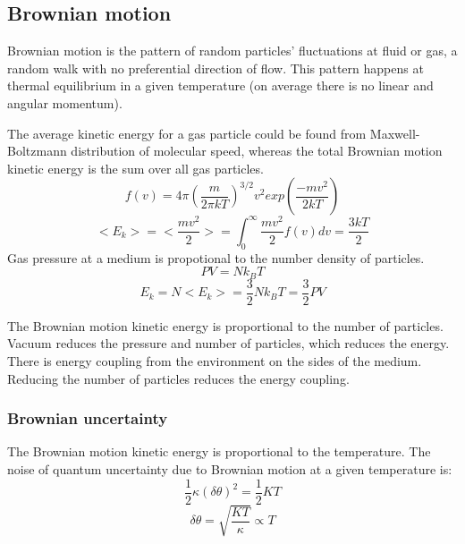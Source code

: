 \documentclass[\main/master.tex]{subfiles}
\begin{document}
\subsection{Brownian motion}
Brownian motion is the pattern of random particles' fluctuations at fluid or gas, a random walk with no preferential direction of flow. This pattern happens at thermal equilibrium in a given temperature (on average there is no linear and angular momentum). 
\par\noindent
The average kinetic energy for a gas particle could be found from Maxwell-Boltzmann distribution of molecular speed, whereas the total Brownian motion kinetic energy is the sum over all gas particles.
\begin{equation}
f(v) = 4\pi(\frac{m}{2\pi kT})^{3/2}v^2exp(\frac{-mv^2}{2kT})     \label{eqn:Maxwell_Boltzmann}
\end{equation}  
\begin{equation}
<E_k>=<\frac{mv^2}{2}> = \int_{0}^{\infty}\frac{mv^2}{2}f(v)dv =  \frac{3kT}{2}    \label{eqn:avrage_kinetic}
\end{equation}
Gas pressure at a medium is propotional to the number density of particles.    
\begin{equation}
PV = Nk_BT  \label{eqn:ideal-gasses}
\end{equation}
\begin{equation}
E_k=N<E_k> =\frac{3}{2}Nk_BT = \frac{3}{2}PV    \label{eqn:total_kinetic}
\end{equation}

\noindent
The Brownian motion kinetic energy is proportional to the number of particles. Vacuum reduces the pressure and number of particles, which reduces the energy. There is energy coupling from the environment on the sides of the medium. Reducing the number of particles reduces the energy coupling.
\subsubsection{Brownian uncertainty}
The Brownian motion kinetic energy is proportional to the temperature. The noise of quantum uncertainty due to Brownian motion at a given temperature is: 
\begin{equation}
\frac{1}{2}\kappa (\delta\theta)^2= \frac{1}{2}KT  \label{eqn:radiation force}
\end{equation}
\begin{equation}
\delta\theta = \sqrt{\frac{KT}{\kappa}}\propto{T}  \label{eqn:radiation force}
\end{equation}
\end{document}
